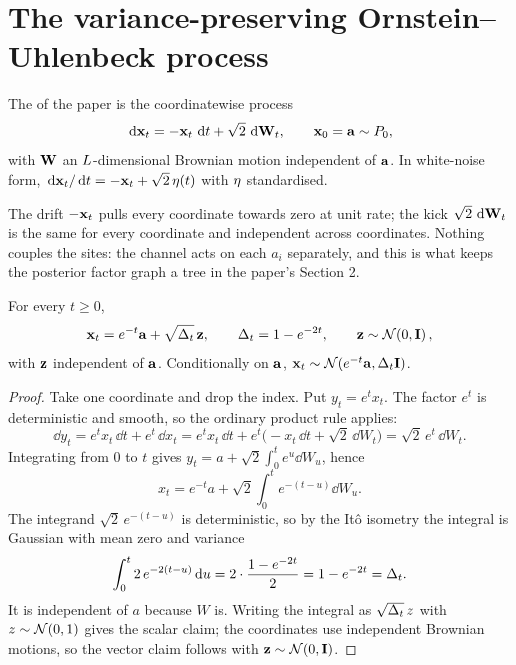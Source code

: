 \section{The variance-preserving Ornstein--Uhlenbeck process}
\label{sec:ou:process}

\begin{definition}
\label{def:ou:channel}
The  of the paper is the coordinatewise process
\begin{equation}
  \,\mathrm{d}\mathbf{x}_t=-\mathbf{x}_t\,\,\mathrm{d} t+\sqrt2\,\,\mathrm{d}\mathbf{W}_t,\qquad \mathbf{x}_0=\mathbf{a}\sim P_0,
  \label{eq:ou:sde}
\end{equation}
with $\mathbf{W}$ an $L$-dimensional Brownian motion independent of $\mathbf{a}$. In white-noise
form, $\,\mathrm{d}\mathbf{x}_t/\,\mathrm{d} t=-\mathbf{x}_t+\sqrt2\,\mathbf{\eta}(t)$ with $\mathbf{\eta}$ standardised.
\end{definition}

The drift $-\mathbf{x}_t$ pulls every coordinate towards zero at unit rate; the kick
$\sqrt2\,\,\mathrm{d}\mathbf{W}_t$ is the same for every coordinate and independent across
coordinates. Nothing couples the sites: the channel acts on each $a_i$ separately, and
this is what keeps the posterior factor graph a tree in the paper's Section 2.

\begin{proposition}
\label{prop:ou:solution}
For every $t\ge0$,
\begin{equation}
  \mathbf{x}_t=e^{-t}\mathbf{a}+\sqrt{\Delta_t}\,\mathbf{z},\qquad \Delta_t=1-e^{-2t},\qquad \mathbf{z}\sim\mathcal{N}\!\left(0,\mathbf{I}\right),
  \label{eq:ou:solution}
\end{equation}
with $\mathbf{z}$ independent of $\mathbf{a}$. Conditionally on $\mathbf{a}$, $\mathbf{x}_t\sim\mathcal{N}\!\left(e^{-t}\mathbf{a},\Delta_t\mathbf{I}\right)$.
\end{proposition}

\begin{proof}
Take one coordinate and drop the index. Put $y_t=e^{t}x_t$. The factor $e^{t}$ is
deterministic and smooth, so the ordinary product rule applies:
\[
  \dd y_t=e^{t}x_t\,\dd t+e^{t}\,\dd x_t
        =e^{t}x_t\,\dd t+e^{t}\bigl(-x_t\,\dd t+\sqrt2\,\dd W_t\bigr)
        =\sqrt2\,e^{t}\,\dd W_t .
\]
Integrating from $0$ to $t$ gives $y_t=a+\sqrt2\int_0^t e^{u}\dd W_u$, hence
\[
  x_t=e^{-t}a+\sqrt2\int_0^t e^{-(t-u)}\dd W_u .
\]
The integrand $\sqrt2\,e^{-(t-u)}$ is deterministic, so by the It\^o isometry the
integral is Gaussian with mean zero and variance
\[
  \int_0^t 2\,e^{-2(t-u)}\,\mathrm{d} u=2\cdot\frac{1-e^{-2t}}{2}=1-e^{-2t}=\Delta_t .
\]
It is independent of $a$ because $W$ is. Writing the integral as $\sqrt{\Delta_t}\,z$ with
$z\sim\mathcal{N}\!\left(0,1\right)$ gives the scalar claim; the coordinates use independent Brownian
motions, so the vector claim follows with $\mathbf{z}\sim\mathcal{N}\!\left(0,\mathbf{I}\right)$.
\end{proof}


